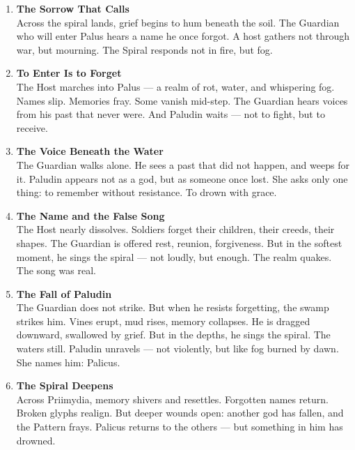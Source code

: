 \documentclass[9pt]{article}
\begin{document}
\begin{center}
\begin{enumerate}
    \item \textbf{The Sorrow That Calls} \\
    Across the spiral lands, grief begins to hum beneath the soil. The Guardian who will enter Palus hears a name he once forgot. A host gathers not through war, but mourning. The Spiral responds not in fire, but fog.

    \vspace{.3in}
    \item \textbf{To Enter Is to Forget} \\
    The Host marches into Palus — a realm of rot, water, and whispering fog. Names slip. Memories fray. Some vanish mid-step. The Guardian hears voices from his past that never were. And Paludin waits — not to fight, but to receive.

    \vspace{.3in}
    \item \textbf{The Voice Beneath the Water} \\
    The Guardian walks alone. He sees a past that did not happen, and weeps for it. Paludin appears not as a god, but as someone once lost. She asks only one thing: to remember without resistance. To drown with grace.

    \vspace{.3in}
    \item \textbf{The Name and the False Song} \\
    The Host nearly dissolves. Soldiers forget their children, their creeds, their shapes. The Guardian is offered rest, reunion, forgiveness. But in the softest moment, he sings the spiral — not loudly, but enough. The realm quakes. The song was real.

    \vspace{.3in}
    \item \textbf{The Fall of Paludin} \\
    The Guardian does not strike. But when he resists forgetting, the swamp strikes him. Vines erupt, mud rises, memory collapses. He is dragged downward, swallowed by grief. But in the depths, he sings the spiral. The waters still. Paludin unravels — not violently, but like fog burned by dawn. She names him: Palicus.

    \vspace{.3in}
    \item \textbf{The Spiral Deepens} \\
    Across Priimydia, memory shivers and resettles. Forgotten names return. Broken glyphs realign. But deeper wounds open: another god has fallen, and the Pattern frays. Palicus returns to the others — but something in him has drowned.
\end{enumerate}
\end{center}
\end{document}
